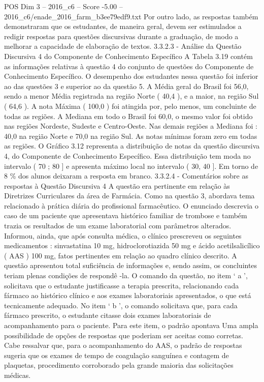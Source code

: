 \begin{textsample}{POS Dim 3 – 2016\_c6 – Score -5.00 – 2016\_c6/enade\_2016\_farm\_b3ee79edf9.txt}
Por outro lado, as respostas também demonstraram que os estudantes, de maneira geral, devem ser estimulados a redigir respostas para questões discursivas durante a graduação, de modo a melhorar a capacidade de elaboração de textos. 3.3.2.3 - Análise da Questão Discursiva 4 do Componente de Conhecimento Específico A Tabela 3.19 contém as informações relativas à questão 4 do conjunto de questões do Componente de Conhecimento Específico.
O desempenho dos estudantes nessa questão foi inferior ao das questões 3 e superior ao da questão 5.
A Média geral do Brasil foi 56,0, sendo a menor Média registrada na região Norte ( 40,4 ), e a maior, na região Sul ( 64,6 ).
A nota Máxima ( 100,0 ) foi atingida por, pelo menos, um concluinte de todas as regiões.
A Mediana em todo o Brasil foi 60,0, o mesmo valor foi obtido nas regiões Nordeste, Sudeste e Centro-Oeste.
Nas demais regiões a Mediana foi : 40,0 na região Norte e 70,0 na região Sul.
As notas mínimas foram zero em todas as regiões.
O Gráfico 3.12 representa a distribuição de notas da questão discursiva 4, do Componente de Conhecimento Específico.
Essa distribuição tem moda no intervalo ( 70 ; 80 ] e apresenta máximo local no intervalo ( 30, 40 ].
Em torno de 8 \% dos alunos deixaram a resposta em branco. 3.3.2.4 - Comentários sobre as respostas à Questão Discursiva 4 A questão era pertinente em relação às Diretrizes Curriculares da área de Farmácia.
Como na questão 3, abordava tema relacionado à prática diária do profissional farmacêutico.
O enunciado descrevia o caso de um paciente que apresentava histórico familiar de trombose e também trazia os resultados de um exame laboratorial com parâmetros alterados.
Informou, ainda, que após consulta médica, o clínico prescreveu os seguintes medicamentos : sinvastatina 10 mg, hidroclorotiazida 50 mg e ácido acetilsalicílico ( AAS ) 100 mg, fatos pertinentes em relação ao quadro clínico descrito.
A questão apresentou total suficiência de informações e, sendo assim, os concluintes teriam plenas condições de respondê -la.
O comando da questão, no item ‘ a ’, solicitava que o estudante justificasse a terapia prescrita, relacionando cada fármaco ao histórico clínico e aos exames laboratoriais apresentados, o que está tecnicamente adequado.
No item ‘ b ’, o comando solicitava que, para cada fármaco prescrito, o estudante citasse dois exames laboratoriais de acompanhamento para o paciente.
Para este item, o padrão apontava Uma ampla possibilidade de opções de respostas que poderiam ser aceitas como corretas.
Cabe ressalvar que, para o acompanhamento do AAS, o padrão de respostas sugeria que os exames de tempo de coagulação sanguínea e contagem de plaquetas, procedimento corroborado pela grande maioria das solicitações médicas.

\end{textsample}
